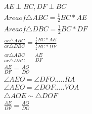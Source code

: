 \begin{frame}
\begin{align*}
AE\perp BC , DF\perp BC\\
Area of \triangle{ABC} = \frac{1}{2}BC*AE\\
Area of \triangle{DBC} = \frac{1}{2}BC*DF\\
\frac{ar\triangle{ABC}}{ar\triangle{DBC}}=\frac{\frac{1}{2}BC*AE}{\frac{1}{2}BC*DF}\\  
\frac{ar\triangle{ABC}}{ar\triangle{DBC}}=\frac{AE}{DF}\\
\frac{AE}{DF}=\frac{AO}{DO}\\
\angle{AEO}=\angle{DFO}..... RA\\
\angle{AEO}=\angle{DOF}..... VOA\\
\triangle{AOE} \sim \triangle{DOF}\\
\frac{AE}{DF}=\frac{AO}{DO}\\
\end{align*}

\end{frame}